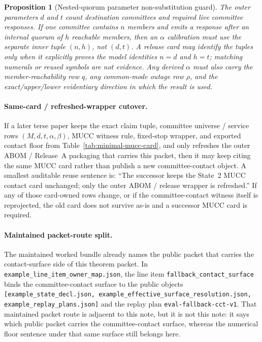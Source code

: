 \documentclass[11pt]{article}
\newtheorem{proposition}{Proposition}
\begin{document}
\begin{proposition}[Nested-quorum parameter non-substitution guard]
\label{prop:mucc-nested-quorum-guard}
The outer parameters $d$ and $t$ count destination committees and required live \emph{committee responses}.  If one committee contains $n$ members and emits a response after an internal quorum of $h$ reachable members, then an $\alpha$ calibration must use the separate inner tuple $(n,h)$, not $(d,t)$.  A release card may identify the tuples only when it explicitly proves the model identities $n=d$ and $h=t$; matching numerals or reused symbols are not evidence.  Any derived $\alpha$ must also carry the member-reachability row $q$, any common-mode outage row $\rho$, and the exact/upper/lower evidentiary direction in which the result is used.
\end{proposition}

\paragraph{Same-card / refreshed-wrapper cutover.}
If a later terse paper keeps the exact claim tuple, committee universe / service rows $(M,d,t,\alpha,\beta)$, MUCC witness rule, fixed-stop wrapper, and exported contact floor from Table~\ref{tab:minimal-mucc-card}, and only refreshes the outer ABOM / Release~A packaging that carries this packet, then it may keep citing the same MUCC card rather than publish a new committee-contact object.
A smallest auditable reuse sentence is: ``The successor keeps the State~2 MUCC contact card unchanged; only the outer ABOM / release wrapper is refreshed.''
If any of those card-owned rows change, or if the committee-contact witness itself is reprojected, the old card does not survive as-is and a successor MUCC card is required.\cite{series:abomoinl,series:release}

\paragraph{Maintained packet-route split.}
The maintained worked bundle already names the public packet that carries the contact-surface side of this theorem packet. In \texttt{example\_line\_item\_owner\_map.json}, the line item \texttt{fallback\_contact\_surface} binds the committee-contact surface to the public objects \texttt{[example\_state\_decl.json, example\_effective\_surface\_resolution.json, example\_replay\_plans.json]} and the replay plan \texttt{eval-fallback-cct-v1}. That maintained packet route is adjacent to this note, but it is not this note: it says which public packet carries the committee-contact surface, whereas the numerical floor sentence under that same surface still belongs here.\cite{series:workedexample}
\end{document}

